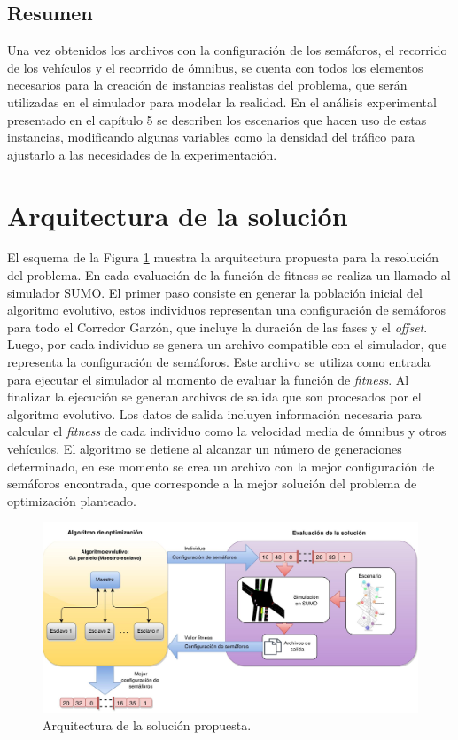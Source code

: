 \subsection{Resumen}

Una vez obtenidos los archivos con la configuración de los semáforos, el recorrido de los vehículos y el recorrido de ómnibus, se cuenta con todos los elementos necesarios para la creación de instancias realistas del problema, que serán utilizadas en el simulador para modelar la realidad.  En el análisis experimental presentado en el capítulo 5 se describen los escenarios que hacen uso de estas instancias, modificando algunas variables como la densidad del tráfico para ajustarlo a las necesidades de la experimentación.


\section{Arquitectura de la solución}

El esquema de la Figura \ref{fig:arquitectura1}  muestra la arquitectura propuesta para la resolución del problema. En cada evaluación de la función de fitness se realiza un llamado al simulador SUMO. El primer paso consiste en generar la población inicial del algoritmo evolutivo, estos individuos representan una configuración de semáforos para todo el Corredor Garzón, que incluye la duración de las fases y el \emph{offset}. Luego, por cada individuo se genera un archivo compatible con el simulador, que representa la configuración de semáforos. Este archivo se utiliza como entrada para ejecutar el simulador al momento de evaluar la función de \emph{fitness}. Al finalizar la ejecución se generan archivos de salida que son procesados por el algoritmo evolutivo. Los datos de salida incluyen información necesaria para calcular el \emph{fitness} de cada individuo como la velocidad media de ómnibus y otros vehículos. El algoritmo se detiene al alcanzar un número de generaciones determinado, en ese momento se crea un archivo con la mejor configuración de semáforos encontrada, que corresponde a la mejor solución del problema de optimización planteado. 

\begin{figure}[H]
	\centering
	\includegraphics[width=0.7\linewidth]{Figures/arquitectura1}
	\caption{Arquitectura de la solución propuesta.}
	\label{fig:arquitectura1}
\end{figure}

